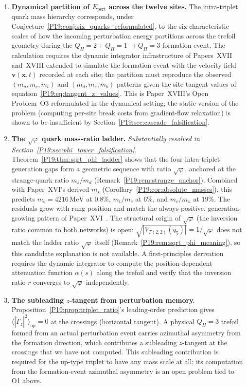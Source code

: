 \documentclass[11pt,a4paper]{article}
\theoremstyle{definition}\newtheorem{definition}[theorem]{Definition}
\theoremstyle{remark}
\newcommand{\vp}{\varphi}
\newcommand{\QH}{Q_H}
\newcommand{\Jones}{V}
\newcommand{\tang}{\dot\Gamma}
\begin{document}
\begin{enumerate}[leftmargin=2em,label=\textbf{O\arabic*.}]

\item \textbf{Dynamical partition of $E_{\mathrm{pert}}$ across the
twelve sites.}  The intra-triplet quark mass hierarchy corresponds,
under Conjecture~\ref{P19:conj:six_quarks_reformulated}, to the
six characteristic scales of how the incoming perturbation energy
partitions across the trefoil geometry during the
$\QH=2+\QH=1\to\QH=3$ formation event.  The calculation requires
the dynamic integrator infrastructure of Papers~XVII and~XVIII
extended to simulate the formation event with the velocity field
$\mathbf{v}(\mathbf{x},t)$ recorded at each site; the partition
must reproduce the observed $(m_u,m_c,m_t)$ and $(m_d,m_s,m_b)$
patterns given the site tangent values of
equation~\eqref{P19:eq:tangent_z_values}.  This is Paper~XVIII's
Open Problem~O3 reformulated in the dynamical setting; the static
version of the problem (computing per-site break costs from
gradient-flow relaxation) is shown to be insufficient by
Section~\ref{P19:sec:cascade_falsification}.

\item \textbf{The $\sqrt{\vp}$ quark mass-ratio ladder.}
\emph{Substantially resolved in Section~\ref{P19:sec:phi_tower_falsification}.}
Theorem~\ref{P19:thm:sqrt_phi_ladder} shows that the four
intra-triplet generation gaps form a geometric sequence with ratio
$\sqrt{\vp}$, anchored at the strange-quark ratio $m_s/m_d$
(Remark~\ref{P19:rem:strange_anchor}).  Combined with
Paper~XVI's derived $m_s$ (Corollary~\ref{P19:cor:absolute_masses}),
this predicts $m_b=4216\,\mathrm{MeV}$ at $0.8\%$, $m_t/m_c$ at
$6\%$, and $m_c/m_u$ at $19\%$.  The residuals grow with rung
position and match the always-positive, generation-growing
pattern of Paper~XVI~\cite{Paper16}.
The structural origin of $\sqrt{\vp}$ (the inversion ratio common
to both networks) is open: $\sqrt{|\Jones_{T(2,2)}(q_5)|}=1/\sqrt{\vp}$
does not match the ladder ratio $\sqrt{\vp}$ itself
(Remark~\ref{P19:rem:sqrt_phi_meaning}), so this candidate
explanation is not available.  A first-principles derivation
requires the dynamic integrator to compute
the position-dependent attenuation function $\alpha(s)$
along the trefoil and verify that the inversion ratio $r$ converges
to $\sqrt{\vp}$ independently.

\item \textbf{The subleading $z$-tangent from perturbation memory.}
Proposition~\ref{P19:prop:triplet_ratio}'s leading-order prediction
gives $\langle |\tang_z|^2\rangle_{\mathrm{up}}=0$ at the
crossings (horizontal tangent).  A physical
$\QH=3$ trefoil formed from an actual perturbation event carries
azimuthal asymmetry from the formation direction, which contributes
a subleading $z$-tangent at the crossings that we have not
computed.  This subleading contribution is required for the up-type
triplet to have any mass scale at all; its computation from the
formation-event azimuthal asymmetry is an open problem tied to O1
above.


\end{enumerate}
\end{document}
